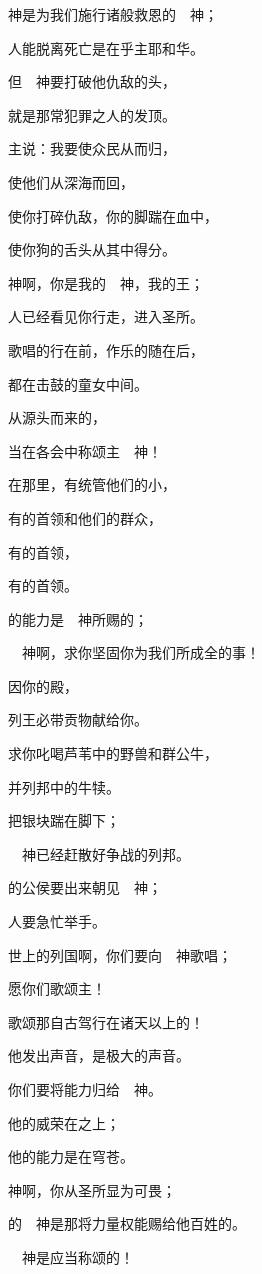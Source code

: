 {\Q {}神是为我们施行诸般救恩的　神；
\par }{\Q 人能脱离死亡是在乎主耶和华。
\par }{\BB \par }{\Q {}但　神要打破他仇敌的头，
\par }{\Q 就是那常犯罪之人的发顶。
\par }{\Q {}主说：我要使众民从{}而归，
\par }{\Q 使他们从深海而回，
\par }{\Q {}使你打碎仇敌，你的脚踹在血中，
\par }{\Q 使你狗的舌头从其中得分。
\par }{\BB \par }{\Q {}神啊，你是我的　神，我的王；
\par }{\Q 人已经看见你行走，进入圣所。
\par }{\Q {}歌唱的行在前，作乐的随在后，
\par }{\Q 都在击鼓的童女中间。
\par }{\Q {}从{}源头而来的，
\par }{\Q 当在各会中称颂主　神！
\par }{\Q {}在那里，有统管他们的小{}，
\par }{\Q 有{}的首领和他们的群众，
\par }{\Q 有{}的首领，
\par }{\Q 有{}的首领。
\par }{\BB \par }{\Q {}的能力是　神所赐的；
\par }{\Q 　神啊，求你坚固你为我们所成全的事！
\par }{\Q {}因你{}的殿，
\par }{\Q 列王必带贡物献给你。
\par }{\Q {}求你叱喝芦苇中的野兽和群公牛，
\par }{\Q 并列邦中的牛犊。
\par }{\Q 把银块踹在脚下；
\par }{\Q 　神已经赶散好争战的列邦。
\par }{\Q {}的公侯要出来朝见　神；
\par }{人要急忙举手{}。
\par }{\Q {}世上的列国啊，你们要向　神歌唱；
\par }{\Q 愿你们歌颂主！
\par }{\Q {}歌颂那自古驾行在诸天以上的{}！
\par }{\Q 他发出声音，是极大的声音。
\par }{\Q {}你们要将能力归给　神。
\par }{\Q 他的威荣在{}之上；
\par }{\Q 他的能力是在穹苍。
\par }{\Q {}神啊，你从圣所显为可畏；
\par }{的　神是那将力量权能赐给他百姓的。
\par }{\BB \par }{\Q 　神是应当称颂的！

}
